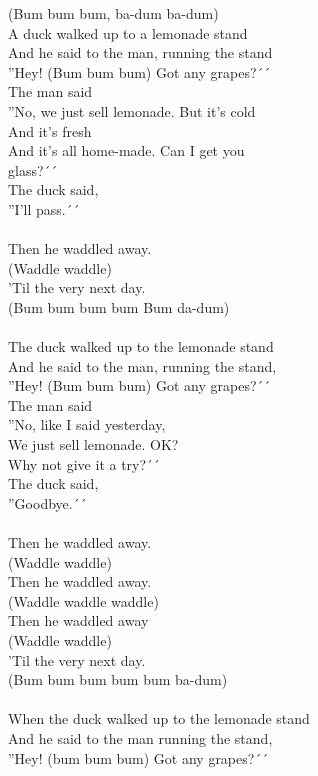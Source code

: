 \vspace{10pt}
(Bum bum bum, ba-dum ba-dum)\\
A duck walked up to a lemonade stand\\
And he said to the man, running the stand\\
''Hey! (Bum bum bum) Got any grapes?´´\\
The man said\\
''No, we just sell lemonade. But it's cold\\
And it's fresh\\
And it's all home-made. Can I get you\\
glass?´´\\
The duck said,\\
''I'll pass.´´\\
\\
Then he waddled away.\\
(Waddle waddle)\\
'Til the very next day.\\
(Bum bum bum bum Bum da-dum)\\
\\
The duck walked up to the lemonade stand\\
And he said to the man, running the stand,\\
''Hey! (Bum bum bum) Got any grapes?´´\\
The man said\\
''No, like I said yesterday,\\
We just sell lemonade. OK?\\
Why not give it a try?´´\\
The duck said,\\
''Goodbye.´´\\
\\
Then he waddled away.\\
(Waddle waddle)\\
Then he waddled away.\\
(Waddle waddle waddle)\\
Then he waddled away\\
(Waddle waddle)\\
'Til the very next day.\\
(Bum bum bum bum bum ba-dum)\\
\\
When the duck walked up to the lemonade stand\\
And he said to the man running the stand,\\
''Hey! (bum bum bum) Got any grapes?´´\\
